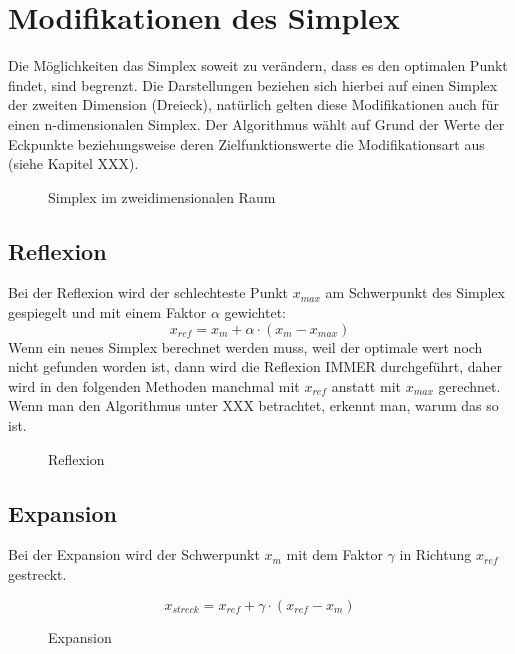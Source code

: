 
\section{Modifikationen des Simplex}
Die Möglichkeiten das Simplex soweit zu verändern, dass es den optimalen Punkt findet, sind begrenzt.
Die Darstellungen beziehen sich hierbei auf einen Simplex der zweiten Dimension (Dreieck), natürlich gelten diese Modifikationen auch für einen n-dimensionalen Simplex. Der Algorithmus wählt auf Grund der Werte der Eckpunkte beziehungsweise deren Zielfunktionswerte die Modifikationsart aus (siehe Kapitel XXX).

\begin{figure}[h]
	\centering
  	\caption{Simplex im zweidimensionalen Raum}%
	\label{fig:Dreieck}%
\end{figure}

\subsection{Reflexion}
Bei der Reflexion wird der schlechteste Punkt $x_{max}$ am Schwerpunkt des Simplex gespiegelt und mit einem Faktor $\alpha$ gewichtet: 
\begin{equation}
x_{ref} = x_m + \alpha \cdot (x_m-x_{max})
\end{equation}
Wenn ein neues Simplex berechnet werden muss, weil der optimale wert noch nicht gefunden worden ist, dann wird die Reflexion IMMER durchgeführt, daher wird in den folgenden Methoden manchmal mit $x_{ref}$ anstatt mit $x_{max}$ gerechnet. Wenn man den Algorithmus unter XXX betrachtet, erkennt man, warum das so ist.  
\begin{figure}[h]
	\centering
  	\caption{Reflexion}%
	\label{fig:Reflexion}%
\end{figure}

\subsection{Expansion}
Bei der Expansion wird der Schwerpunkt $x_m$ mit dem Faktor $\gamma$ in Richtung $x_{ref}$ gestreckt. 

\begin{equation}
x_{streck} = x_{ref} + \gamma \cdot (x_{ref}-x_{m})
\end{equation}
\begin{figure}[h]
	\centering
  	\caption{Expansion}%
	\label{fig:Streckung}%
\end{figure}
\newpage
